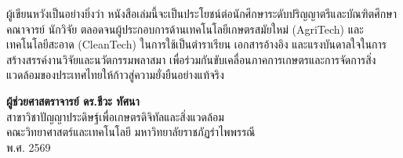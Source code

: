 ผู้เขียนหวังเป็นอย่างยิ่งว่า หนังสือเล่มนี้จะเป็นประโยชน์ต่อนักศึกษาระดับปริญญาตรีและบัณฑิตศึกษา คณาจารย์ นักวิจัย ตลอดจนผู้ประกอบการด้านเทคโนโลยีเกษตรสมัยใหม่ (AgriTech) และเทคโนโลยีสะอาด (CleanTech) ในการใช้เป็นตำราเรียน เอกสารอ้างอิง และแรงบันดาลใจในการสร้างสรรค์งานวิจัยและนวัตกรรมพลาสมา เพื่อร่วมกันขับเคลื่อนภาคการเกษตรและการจัดการสิ่งแวดล้อมของประเทศไทยให้ก้าวสู่ความยั่งยืนอย่างแท้จริง

\vspace{1.5cm}
\begin{flushright}
    \textbf{ผู้ช่วยศาสตราจารย์ ดร.ชีวะ ทัศนา}\\
    สาขาวิชาปัญญาประดิษฐ์เพื่อเกษตรดิจิทัลและสิ่งแวดล้อม\\
    คณะวิทยาศาสตร์และเทคโนโลยี มหาวิทยาลัยราชภัฏรำไพพรรณี\\
    พ.ศ. 2569
\end{flushright}

\clearpage
